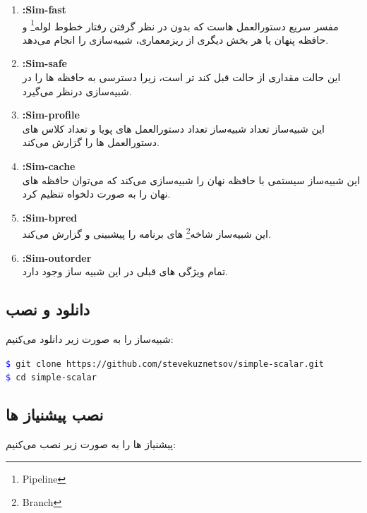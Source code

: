 \documentclass[12pt]{exam}
\begin{document}
\begin{questions}
\begin{enumerate}
	\item \textbf{:Sim-fast}\\
	مفسر سریع دستورالعمل هاست که بدون در نظر گرفتن رفتار خطوط لوله\footnote{Pipeline} و حافظه پنهان یا هر بخش دیگری از ریزمعماری، شبیه‌سازی را انجام می‌دهد.
	
	
	\item \textbf{:Sim-safe}\\
	این حالت مقداری از حالت قبل کند تر است، زیرا دسترسی به حافظه ها را در شبیه‌سازی درنظر می‌گیرد.
	
	
	\item \textbf{:Sim-profile}\\
	این شبیه‌ساز تعداد شبیه‌ساز تعداد دستورالعمل های پویا و تعداد کلاس های دستورالعمل ها را گزارش می‌کند.
	
	\item \textbf{:Sim-cache}\\
	این شبیه‌ساز سیستمی با حافظه نهان را شبیه‌سازی می‌کند که می‌توان حافظه های نهان را به صورت دلخواه تنظیم کرد.
	
	
	\item \textbf{:Sim-bpred}\\
	این شبیه‌ساز شاخه‌\footnote{Branch} های برنامه را پیشبینی و گزارش می‌کند.
	
	
	\item \textbf{:Sim-outorder}\\
	تمام ویژگی های قبلی در این شبیه ساز وجود دارد.
\end{enumerate}


\subsection{دانلود و نصب}
شبیه‌ساز را به صورت زیر دانلود می‌کنیم: \\
\begin{latin}
	\texttt{\textcolor{blue}{\$} git clone https://github.com/stevekuznetsov/simple-scalar.git} \\
	\texttt{\textcolor{blue}{\$} cd simple-scalar} \\
\end{latin}


\subsection{نصب پیشنیاز ها}

پیشنیاز ها را به صورت زیر نصب می‌کنیم: \\


\end{questions}
\end{document}
